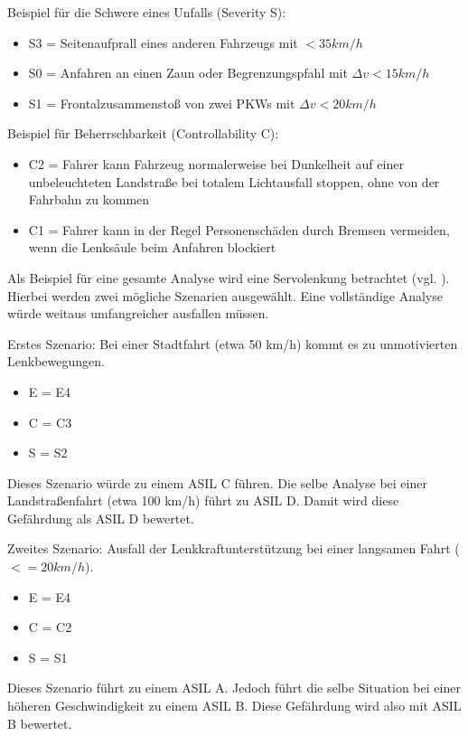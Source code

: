 \documentclass[a4paper,DIV=calc,ngerman]{scrartcl}
\begin{document}
Beispiel für die Schwere eines Unfalls (Severity S):
\begin{itemize}
    \item S3 = Seitenaufprall eines anderen Fahrzeugs mit $< 35 km/h$
    \item S0 = Anfahren an einen Zaun oder Begrenzungspfahl mit $\Delta v < 15 km/h$
    \item S1 = Frontalzusammenstoß von zwei PKWs mit $\Delta v < 20 km/h$
\end{itemize}

Beispiel für Beherrschbarkeit (Controllability C):
\begin{itemize}
    \item C2 = Fahrer kann Fahrzeug normalerweise bei Dunkelheit auf einer unbeleuchteten Landstraße bei totalem Lichtausfall stoppen, ohne von der Fahrbahn zu kommen
    \item C1 = Fahrer kann in der Regel Personenschäden durch Bremsen vermeiden, wenn die Lenksäule beim Anfahren blockiert
\end{itemize}

Als Beispiel für eine gesamte Analyse wird eine Servolenkung betrachtet (vgl. \cite[S. 217]{1}). Hierbei werden zwei mögliche Szenarien ausgewählt. Eine vollständige Analyse würde weitaus umfangreicher ausfallen müssen.

Erstes Szenario: Bei einer Stadtfahrt (etwa 50 km/h) kommt es zu unmotivierten Lenkbewegungen.
\begin{itemize}
    \item E = E4
    \item C = C3
    \item S = S2
\end{itemize}

Dieses Szenario würde zu einem ASIL C führen. Die selbe Analyse bei einer Landstraßenfahrt (etwa 100 km/h) führt zu ASIL D. Damit wird diese Gefährdung als ASIL D bewertet.

Zweites Szenario: Ausfall der Lenkkraftunterstützung bei einer langsamen Fahrt ($<= 20 km/h$).

\begin{itemize}
    \item E = E4
    \item C = C2
    \item S = S1
\end{itemize}

Dieses Szenario führt zu einem ASIL A. Jedoch führt die selbe Situation bei einer höheren Geschwindigkeit zu einem ASIL B. Diese Gefährdung wird also mit ASIL B bewertet.
\end{document}
